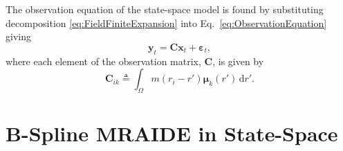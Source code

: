 \documentclass[review,authoryear,3p]{elsarticle}
\begin{document}
The observation equation of the state-space model is found by substituting decomposition \eqref{eq:FieldFiniteExpansion}
 into Eq.~\eqref{eq:ObservationEquation} giving
\begin{equation}\label{eq:ReducedObservationEquation} 
	\mathbf{y}_t = \mathbf{C}\mathbf{x}_t + \boldsymbol{\varepsilon}_t,
\end{equation}
where each element of the observation matrix, $\mathbf{C}$, is given by
\begin{equation}\label{eq:Observationmatrix}
	\mathbf{C}_{ik} \triangleq \int_{\Omega}m(r_i -r')\boldsymbol{\mu}_k(r') \, \mathrm{d}r'.
\end{equation}
\section{B-Spline MRAIDE in State-Space }
\end{document}
